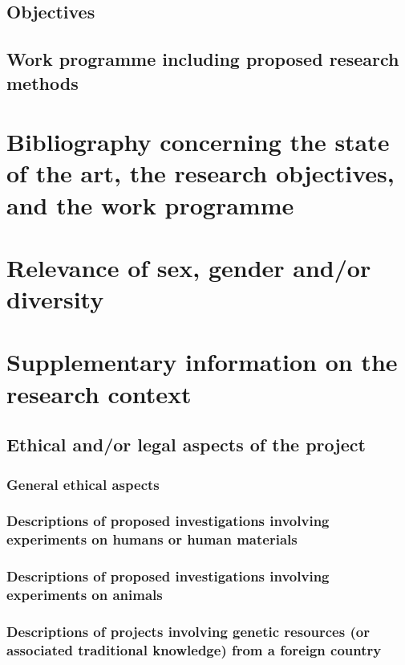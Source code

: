 \documentclass{scrartcl}
\begin{document}
\subsection{Objectives}

\subsection{Work programme including proposed research methods}


\section{Bibliography concerning the state of the art, the research objectives, and the work programme}

\printbibliography[notcategory=reviewed, notcategory=nonreviewed, notcategory=patents_pending, notcategory=patents, heading=none]


\section{Relevance of sex, gender and/or diversity}


\section{Supplementary information on the research context}

\subsection{Ethical and/or legal aspects of the project}

\subsubsection{General ethical aspects}

\subsubsection{Descriptions of proposed investigations involving experiments on humans or human materials}

\subsubsection{Descriptions of proposed investigations involving experiments on animals}

\subsubsection{Descriptions of projects involving genetic resources (or associated traditional knowledge) from a foreign country}
\end{document}
